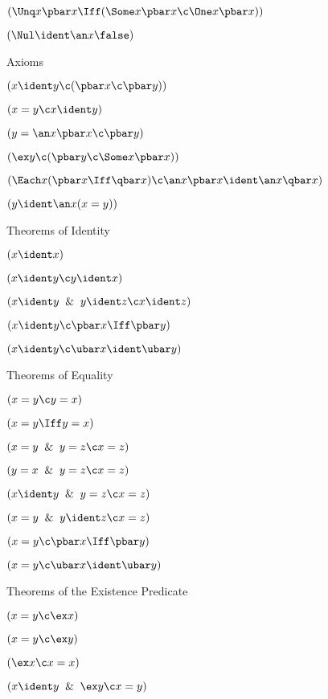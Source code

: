   $(\Unq x \pbar x \Iff (\Some x \pbar x \c \One x \pbar x))$

 $(\Nul \ident \an x \false)$
\lineb


\noindent{}Axioms

 $(x \ident y \c (\pbar x \c \pbar y))$

 $(x=y \c x \ident y)$

 $(y = \an x \pbar x \c \pbar y)$

 $(\ex y  \c (\pbar y \c \Some x \pbar x))$

 $(\Each x (\pbar x \Iff \qbar x) \c \an x \pbar x \ident \an x \qbar x)$

 $(y \ident \an x (x = y))$
\lineb

%

\noindent{}Theorems of Identity

 $(x \ident x)$

 $(x \ident y \c y \ident x)$

 $(x \ident y\And y \ident z \c x \ident z)$

 $(x \ident y\c \pbar x \Iff \pbar y)$

 $(x \ident y\c \ubar x \ident \ubar y)$
\lineb


\noindent{}Theorems of Equality

 $(x = y \c y = x)$

 $(x = y \Iff y = x)$

 $(x = y\And y = z \c x = z)$

 $(y = x\And y = z \c x = z)$

 $(x \ident y \And y = z \c x = z)$

 $(x = y \And y \ident z \c x = z)$

 $(x = y \c \pbar x \Iff \pbar y)$

 $(x = y \c \ubar x \ident \ubar y)$
\lineb

\noindent{}Theorems of the Existence Predicate
 
 $(x = y \c \ex x)$

 $(x = y \c \ex y)$

 $(\ex x \c x = x)$

 $(x \ident y \And \ex y \c x =y)$

